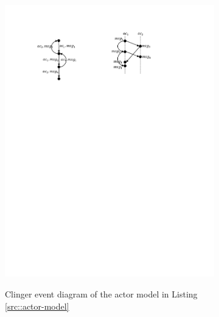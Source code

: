 \begin{figure}
\centering
\begin{subfigure}[b]{0.2\textwidth}
  \centering
  \small{
   \includegraphics[width=.8\textwidth]{resources/clinger.pdf}
  }
  \caption{Clinger event diagram of the actor model in Listing \ref{src::actor-model}}
  \label{fig::clinger}
\end{subfigure}
\qquad
\begin{subfigure}[b]{0.2\textwidth}


\end{subfigure}
\end{figure}
